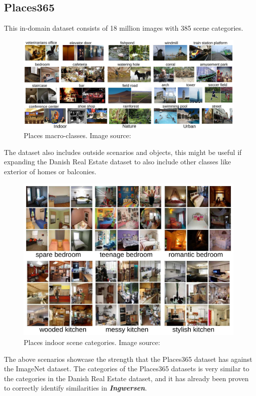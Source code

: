 \subsection{Places365}\label{sec:Places365}
This in-domain dataset consists of 18 million images with 385 scene categories.
\begin{figure}[H]
    \centering
    \includegraphics[scale=0.28]{pictures/random/placesart_1}
    \caption{Places macro-classes. Image source: \autocite{Places365}}
    \label{fig:placesdata1}
\end{figure}
The dataset also includes outside scenarios and objects, this might be useful if expanding the Danish Real Estate dataset to also include other classes like exterior of homes or balconies.
\begin{figure}[H]
    \centering
    \includegraphics[scale=0.4]{pictures/random/placesart_2}
    \caption{Places indoor scene categories. Image source: \autocite{Places365}}
    \label{fig:placesdata2}
\end{figure}
The above scenarios showcase the strength that the Places365 dataset has against the ImageNet dataset. The categories of the Places365 datasets is very similar to the categories in the Danish Real Estate dataset, and it has already been proven to correctly identify similarities in \textbf{\textit{Ingwersen}}\autocite{Ingwersen}. 
